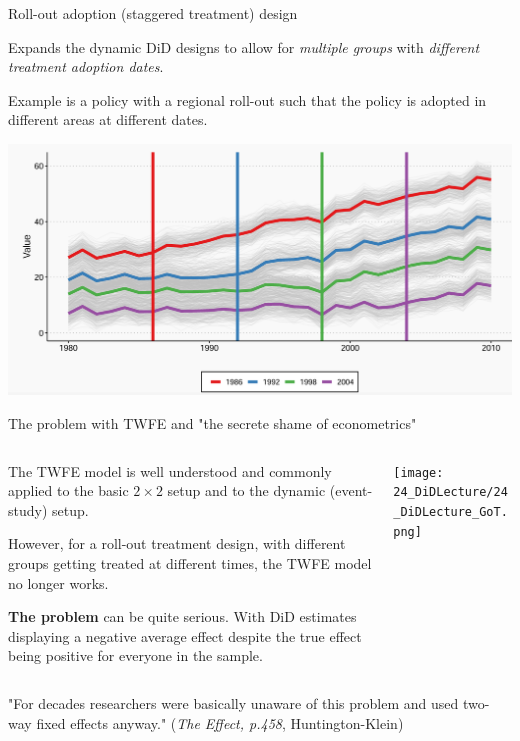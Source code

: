 \documentclass[notes,11pt, aspectratio=169]{beamer}
\newenvironment{wideitemize}{\itemize\addtolength{\itemsep}{10pt}}{\enditemize}
\begin{document}
\begin{frame}{Roll-out adoption (staggered treatment) design}
      \begin{wideitemize}
          \item Expands the dynamic DiD designs to allow for \textit{multiple groups} with \textit{different treatment adoption dates}. \item Example is a policy with a regional roll-out such that the policy is adopted in different areas at different dates.
\vspace{1cm}
    \begin{center}
        \includegraphics[width=0.6\linewidth]{24_DiDLecture/24_DiDLecture_StaggeredRollout.png}
    \end{center}
          
      \end{wideitemize}
\end{frame}

\begin{frame}{The problem with TWFE and "the secrete shame of econometrics"}
\begin{columns}[T] %
    \begin{column}{0.6\textwidth}
      \begin{wideitemize} 
        \item The TWFE model is well understood and commonly applied to the basic $2\times2$ setup and to the dynamic (event-study) setup.
        \item However, for a roll-out treatment design, with different groups getting treated at different times, the TWFE model no longer works.
        \item \textbf{The problem} can be quite serious. With DiD estimates displaying a negative average effect despite the true effect being positive for everyone in the sample. 
            \end{wideitemize}
    \end{column}%
    \hfill%
    \begin{column}{.4\textwidth}
    \begin{center}
 \texttt{[image: 24\_DiDLecture/24\_DiDLecture\_GoT.png]}                 
    \end{center}
    \end{column}
  \end{columns}
  \begin{displayquote}
  "For decades researchers were basically unaware of this problem and used two-way fixed effects anyway."
  \flushright\tiny (\emph{The Effect, p.458}, Huntington-Klein)
\end{displayquote}
    \end{frame}
\end{document}
